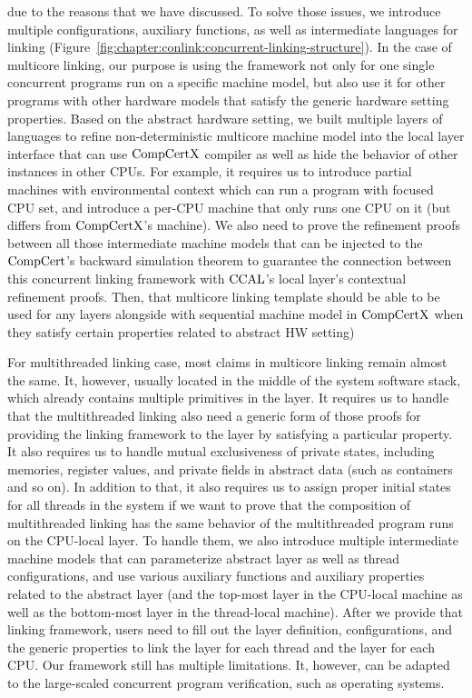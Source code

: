 due to the reasons that we have discussed. 
To solve those issues, 
we introduce multiple configurations, auxiliary functions, as well as intermediate languages for linking (Figure~\ref{fig:chapter:conlink:concurrent-linking-structure}). 
In the case of multicore linking, 
our purpose is using the framework not only for one single concurrent programs run on a specific machine model, 
but also use it for other programs with other hardware models that satisfy the generic hardware setting properties. 
Based on the abstract hardware setting, 
we built multiple layers of languages to refine non-deterministic multicore machine model 
into the local layer interface that can use $\mathrm{CompCertX}$ compiler as well as 
hide the behavior of other instances in other CPUs.
For example, 
it requires us to introduce partial machines with environmental context which can run a program with focused CPU set, 
and introduce a per-CPU machine that only runs one CPU on it (but differs from $\mathrm{CompCertX}$'s machine). 
We also need to prove the refinement proofs between all those intermediate machine models
that can be injected to the $\mathrm{CompCert}$'s backward simulation theorem to guarantee the connection between this concurrent linking framework with $\mathrm{CCAL}$'s local layer's contextual refinement proofs. 
Then, that multicore linking template should be able to be used for any layers alongside with sequential machine model in $\mathrm{CompCertX}$ when they satisfy certain properties related to abstract HW setting)

For multithreaded linking case, most claims in multicore linking remain almost the same. 
It, however, usually located in the middle of the system software stack, which already contains multiple primitives in the layer. 
It requires us to handle that the multithreaded linking also need a generic form of those proofs for providing the linking framework to the layer by satisfying a particular property. 
It also requires us to handle mutual exclusiveness of 
private states, including memories, register values, and private fields in abstract data (such as containers and so on).
In addition to that, it also requires us to assign proper initial states for all threads in the system if we want to prove that the composition of multithreaded linking has the same behavior of the multithreaded program runs on the CPU-local layer. 
To handle them, we also introduce multiple intermediate machine models that can parameterize abstract layer as well as thread configurations, and use various auxiliary functions and auxiliary properties related to the abstract layer (and the top-most layer in the CPU-local machine as well as the bottom-most layer in the thread-local machine). 
After we provide that linking framework, users need to 
fill out the layer definition, configurations, and the generic properties to link the layer for each thread and the layer for each CPU.
Our framework still has multiple limitations. 
It, however, can be adapted to the large-scaled concurrent program verification, such as operating systems. 

